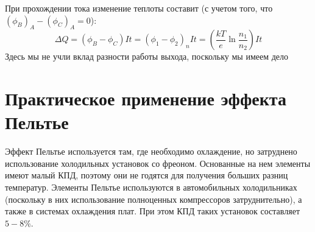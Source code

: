 \documentclass[a4paper, 12pt, openany]{book}
\begin{document}
	При прохождении тока изменение теплоты составит (с учетом того, что $(\phi_B)_A - (\phi_C)_A = 0$):
	\begin{equation}
	\Delta Q = (\phi_B - \phi_C) It = (\phi_1 - \phi_2)_n It = \left(\frac{kT}{e} \ln \frac{n_1}{n_2}\right) It
	\label{peEq}
	\end{equation}
	Здесь мы не учли вклад разности работы выхода, поскольку мы имеем дело 
	\section{Практическое применение эффекта Пельтье}
	Эффект Пельтье используется там, где необходимо охлаждение, но затруднено использование холодильных установок со фреоном. Основанные на нем элементы имеют малый КПД, поэтому они не годятся для получения больших разниц температур. Элементы Пельтье используются в автомобильных холодильниках (поскольку в них использование полноценных компрессоров затруднительно), а также в системах охлаждения плат. При этом КПД таких установок составляет $5-8\%$.


\end{document}
